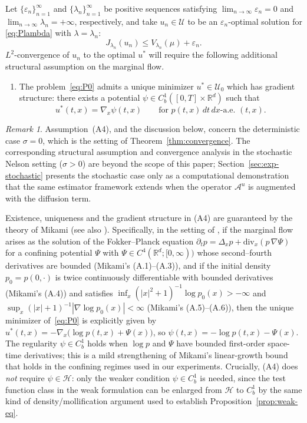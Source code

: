 \documentclass[11pt,leqno]{article}
\theoremstyle{plain}
\theoremstyle{remark}
\newtheorem*{rem}{Remark}
\theoremstyle{definition}
\numberwithin{equation}{section}
\numberwithin{figure}{section}
\numberwithin{table}{section}
\begin{document}
Let $\{\varepsilon_n\}_{n=1}^{\infty}$ and
$\{\lambda_n\}_{n=1}^{\infty}$ be positive sequences satisfying
$\lim_{n\to\infty}\varepsilon_n=0$ and $\lim_{n\to\infty}\lambda_n=+\infty$,
respectively, and take $u_n\in\mathcal{U}$ to be an
$\varepsilon_n$-optimal solution for \eqref{eq:Plambda} with
$\lambda=\lambda_n$:
\begin{equation}\label{eq:eps-opt}
 J_{\lambda_n}(u_n)\le V_{\lambda_n}(\mu) + \varepsilon_n.
\end{equation}
$L^2$-convergence of $u_n$ to the optimal $u^*$ will require the following additional structural assumption
on the marginal flow.
\begin{enumerate}
\item[(A4)] The problem~\eqref{eq:P0} admits a unique minimizer
$u^\ast\in\mathcal{U}_0$ which has gradient structure: there exists a
potential $\psi\in C_b^1([0,T]\times\mathbb{R}^d)$ such that
\[
 u^{\ast}(t,x)=\nabla_x\psi(t,x)\qquad\text{for }p(t,x)\,dt\,dx\text{-a.e. }(t,x).
\]
\end{enumerate}

\begin{rem}\label{rem:A4-Mikami}
Assumption~(A4), and the discussion below, concern the deterministic
case $\sigma=0$, which is the setting of Theorem~\ref{thm:convergence}.
The corresponding structural assumption and convergence analysis in
the stochastic Nelson setting ($\sigma>0$) are beyond the scope of
this paper; Section~\ref{sec:exp-stochastic} presents the stochastic
case only as a computational demonstration that the same estimator
framework extends when the operator
$\mathcal{A}^u$ is augmented with the diffusion term.

Existence, uniqueness and the gradient structure in (A4) are
guaranteed by the theory of Mikami
\cite[Theorem~2.4]{Mikami2000} (see also
\cite[Proposition~3.7, Theorem~3.8]{Mikami2021}).  Specifically, in
the setting of \cite{Mikami2000}, if the marginal flow arises as the
solution of the Fokker--Planck equation
$\partial_t p=\Delta_x p+\mathrm{div}_x(p\,\nabla\Psi)$
for a confining potential $\Psi$ with $\Psi\in C^4(\mathbb{R}^d;[0,\infty))$
whose second--fourth derivatives are bounded
(Mikami's (A.1)--(A.3)), and if the initial density
$p_0=p(0,\cdot)$ is twice continuously differentiable with bounded
derivatives (Mikami's (A.4)) and satisfies
$\inf_x(|x|^2{+}1)^{-1}\log p_0(x)>-\infty$ and
$\sup_x(|x|{+}1)^{-1}|\nabla\log p_0(x)|<\infty$ (Mikami's
(A.5)--(A.6)), then the unique minimizer of~\eqref{eq:P0} is
explicitly given by $u^\ast(t,x)=-\nabla_x\bigl(\log p(t,x)+\Psi(x)\bigr)$,
so $\psi(t,x)=-\log p(t,x)-\Psi(x)$.  The regularity
$\psi\in C_b^1$ holds when $\log p$ and $\Psi$ have bounded
first-order space-time derivatives; this is a mild strengthening of
Mikami's linear-growth bound \cite[Theorem~2.2]{Mikami2000} that
holds in the confining regimes used in our experiments.  Crucially,
(A4) does \emph{not} require $\psi\in\mathcal{H}$: only the weaker
condition $\psi\in C_b^1$ is needed, since the test function class in
the weak formulation can be enlarged from $\mathcal{H}$ to $C_b^1$ by
the same kind of density/mollification argument used to establish
Proposition~\ref{prop:weak-eq}.
\end{rem}
\end{document}

